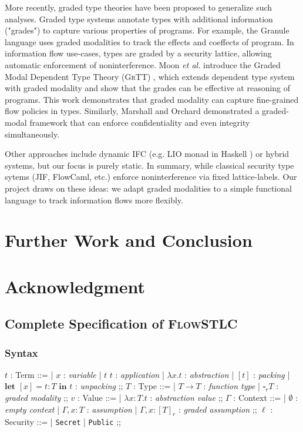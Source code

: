 \documentclass[conference]{IEEEtran}
\newcommand\lam[2]{\lambda #1.#2}
\newcommand\unp[3]{\textbf{let }[#1]=#2\textbf{ in }#3}
\newcommand\gradedt[2]{\square_#1 #2}
\begin{document}
More recently, graded type theories have been proposed to generalize such analyses. Graded type systems annotate types with additional information ("grades") to capture various properties of programs. For example, the Granule language \cite{orchard2019quantitative} uses graded modalities to track the effects and coeffects of program. In information flow use-cases, types are graded by a security lattice, allowing automatic enforcement of noninterference. Moon \emph{et al.} introduce the Graded Modal Dependent Type Theory (\textsc{GrTT}) \cite{moon2021graded}, which extends dependent type system with graded modality and show that the grades can be effective at reasoning of programs. This work demonstrates that graded modality can capture fine-grained flow policies in types. Similarly, Marshall and Orchard  demonstrated a graded-modal framework that can enforce confidentiality and even integrity simultaneously.

Other approaches include dynamic IFC (e.g. LIO monad in Haskell \cite{stefan2011flexible}) or hybrid systems, but our focus is purely static. In summary, while classical security type sytems (JIF, FlowCaml, etc.) enforce noninterference via fixed lattice-labels. Our project draws on these ideas: we adapt graded modalities to a simple functional language to track information flows more flexibly.

\section{Further Work and Conclusion}

\section*{Acknowledgment}




\newpage
\appendix

\subsection{Complete Specification of \textsc{FlowSTLC}}
\subsubsection{Syntax}
\begin{center}
	\begin{bnf}
		$t$ : \textsf{Term} ::=
		| $x$ : \textit{variable}
		| $t$ $t$ : \textit{application}
		| $\lam{x}{t}$ : \textit{abstraction}
		| $[t]$ : \textit{packing}
		| $\unp{x}{t\colon T}{t}$ : \textit{unpacking}
		;;
		$T$ : \textsf{Type} ::=
		| $T\to T$ : \textit{function type}
		| $\gradedt{r}{T}$ : \textit{graded modality}
		;;
		$v$ : \textsf{Value} ::=
		| $\lam{x\colon T}{t}$ : \textit{abstraction value}
		;;
		$\Gamma$ : \textsf{Context} ::=
		| $\emptyset$ : \textit{empty context}
        | $\Gamma,x\colon T$ : \textit{assumption}
		| $\Gamma,x\colon[T]_r$ : \textit{graded assumption}
		;;
		$\ell$ : \textsf{Security} ::=
		| \texttt{Secret}
		| \texttt{Public}
		;;
	\end{bnf}
\end{center}
\end{document}
